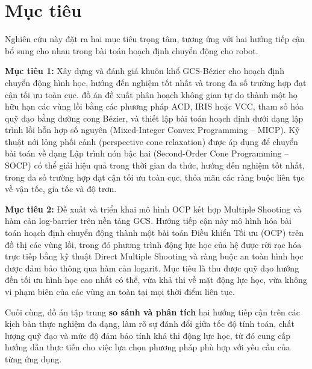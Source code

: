 \section{Mục tiêu}

Nghiên cứu này đặt ra hai mục tiêu trọng tâm, tương ứng với hai hướng tiếp cận bổ sung cho nhau trong bài toán hoạch định chuyển động cho robot.

\textbf{Mục tiêu 1:} Xây dựng và đánh giá khuôn khổ GCS-Bézier cho hoạch định chuyển động hình học, hướng đến nghiệm tốt nhất và trong đa số trường hợp đạt cận tối ưu toàn cục.
đồ án đề xuất phân hoạch không gian tự do thành một họ hữu hạn các vùng lồi bằng các phương pháp ACD, IRIS hoặc VCC, tham số hóa quỹ đạo bằng đường cong Bézier, và thiết lập bài toán hoạch định dưới dạng lập trình lồi hỗn hợp số nguyên (Mixed-Integer Convex Programming -- MICP).
Kỹ thuật nới lỏng phối cảnh (perspective cone relaxation) được áp dụng để chuyển bài toán về dạng Lập trình nón bậc hai (Second-Order Cone Programming -- SOCP) có thể giải hiệu quả trong thời gian đa thức, hướng đến nghiệm tốt nhất, trong đa số trường hợp đạt cận tối ưu toàn cục, thỏa mãn các ràng buộc liên tục về vận tốc, gia tốc và độ trơn.

\textbf{Mục tiêu 2:} Đề xuất và triển khai mô hình OCP kết hợp Multiple Shooting và hàm cản log-barrier trên nền tảng GCS.
Hướng tiếp cận này mô hình hóa bài toán hoạch định chuyển động thành một bài toán Điều khiển Tối ưu (OCP) trên đồ thị các vùng lồi, trong đó phương trình động lực học của hệ được rời rạc hóa trực tiếp bằng kỹ thuật Direct Multiple Shooting và ràng buộc an toàn hình học được đảm bảo thông qua hàm cản logarit.
Mục tiêu là thu được quỹ đạo hướng đến tối ưu hình học cao nhất có thể, vừa khả thi về mặt động lực học, vừa không vi phạm biên của các vùng an toàn tại mọi thời điểm liên tục.

Cuối cùng, đồ án tập trung \textbf{so sánh và phân tích} hai hướng tiếp cận trên các kịch bản thực nghiệm đa dạng, làm rõ sự đánh đổi giữa tốc độ tính toán, chất lượng quỹ đạo và mức độ đảm bảo tính khả thi động lực học, từ đó cung cấp hướng dẫn thực tiễn cho việc lựa chọn phương pháp phù hợp với yêu cầu của từng ứng dụng.
